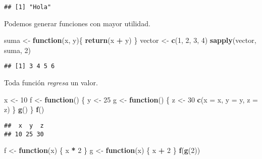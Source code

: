 \documentclass[]{article}
\newenvironment{Shaded}{\begin{snugshade}}{\end{snugshade}}
\newcommand{\KeywordTok}[1]{\textcolor[rgb]{0.13,0.29,0.53}{\textbf{#1}}}
\newcommand{\DataTypeTok}[1]{\textcolor[rgb]{0.13,0.29,0.53}{#1}}
\newcommand{\DecValTok}[1]{\textcolor[rgb]{0.00,0.00,0.81}{#1}}
\newcommand{\StringTok}[1]{\textcolor[rgb]{0.31,0.60,0.02}{#1}}
\newcommand{\ControlFlowTok}[1]{\textcolor[rgb]{0.13,0.29,0.53}{\textbf{#1}}}
\newcommand{\OperatorTok}[1]{\textcolor[rgb]{0.81,0.36,0.00}{\textbf{#1}}}
\newcommand{\NormalTok}[1]{#1}
\begin{document}
\begin{verbatim}
## [1] "Hola"
\end{verbatim}

Podemos generar funciones con mayor utilidad.

\begin{Shaded}
\begin{Highlighting}[]
\NormalTok{suma <-}\StringTok{ }\ControlFlowTok{function}\NormalTok{(x, y)\{}
  \KeywordTok{return}\NormalTok{(x }\OperatorTok{+}\StringTok{ }\NormalTok{y)}
\NormalTok{\}}
\NormalTok{vector <-}\StringTok{ }\KeywordTok{c}\NormalTok{(}\DecValTok{1}\NormalTok{, }\DecValTok{2}\NormalTok{, }\DecValTok{3}\NormalTok{, }\DecValTok{4}\NormalTok{)}
\KeywordTok{sapply}\NormalTok{(vector, suma, }\DecValTok{2}\NormalTok{)}
\end{Highlighting}
\end{Shaded}

\begin{verbatim}
## [1] 3 4 5 6
\end{verbatim}

Toda función \emph{regresa} un valor.

\begin{Shaded}
\begin{Highlighting}[]
\NormalTok{x <-}\StringTok{ }\DecValTok{10}
\NormalTok{f <-}\StringTok{ }\ControlFlowTok{function}\NormalTok{() \{}
\NormalTok{    y <-}\StringTok{ }\DecValTok{25}
\NormalTok{    g <-}\StringTok{ }\ControlFlowTok{function}\NormalTok{() \{}
\NormalTok{        z <-}\StringTok{ }\DecValTok{30}
        \KeywordTok{c}\NormalTok{(}\DataTypeTok{x =}\NormalTok{ x, }\DataTypeTok{y =}\NormalTok{ y, }\DataTypeTok{z =}\NormalTok{ z)}
\NormalTok{    \}}
    \KeywordTok{g}\NormalTok{()}
\NormalTok{\}}
\KeywordTok{f}\NormalTok{()}
\end{Highlighting}
\end{Shaded}

\begin{verbatim}
##  x  y  z 
## 10 25 30
\end{verbatim}

\begin{Shaded}
\begin{Highlighting}[]
\NormalTok{f <-}\StringTok{ }\ControlFlowTok{function}\NormalTok{(x) \{}
\NormalTok{  x }\OperatorTok{*}\StringTok{ }\DecValTok{2}
\NormalTok{\}}
\NormalTok{g <-}\StringTok{ }\ControlFlowTok{function}\NormalTok{(x) \{}
\NormalTok{  x }\OperatorTok{+}\StringTok{ }\DecValTok{2}
\NormalTok{\}}
\KeywordTok{f}\NormalTok{(}\KeywordTok{g}\NormalTok{(}\DecValTok{2}\NormalTok{))}
\end{Highlighting}
\end{Shaded}
\end{document}
